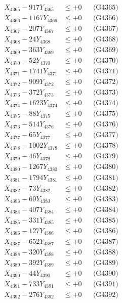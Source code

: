 \documentclass[a4paper,10pt]{article}
\begin{document}
{\begin{align}
X_{4365} - 917Y_{4365} &\leq +0 && \text{(G4365)} \\
X_{4366} - 1167Y_{4366} &\leq +0 && \text{(G4366)} \\
X_{4367} - 207Y_{4367} &\leq +0 && \text{(G4367)} \\
X_{4368} - 24Y_{4368} &\leq +0 && \text{(G4368)} \\
X_{4369} - 363Y_{4369} &\leq +0 && \text{(G4369)} \\
X_{4370} - 52Y_{4370} &\leq +0 && \text{(G4370)} \\
\allowbreak
X_{4371} - 1741Y_{4371} &\leq +0 && \text{(G4371)} \\
X_{4372} - 909Y_{4372} &\leq +0 && \text{(G4372)} \\
X_{4373} - 372Y_{4373} &\leq +0 && \text{(G4373)} \\
X_{4374} - 1623Y_{4374} &\leq +0 && \text{(G4374)} \\
X_{4375} - 88Y_{4375} &\leq +0 && \text{(G4375)} \\
X_{4376} - 514Y_{4376} &\leq +0 && \text{(G4376)} \\
X_{4377} - 65Y_{4377} &\leq +0 && \text{(G4377)} \\
X_{4378} - 1002Y_{4378} &\leq +0 && \text{(G4378)} \\
X_{4379} - 46Y_{4379} &\leq +0 && \text{(G4379)} \\
X_{4380} - 1267Y_{4380} &\leq +0 && \text{(G4380)} \\
\allowbreak
X_{4381} - 1794Y_{4381} &\leq +0 && \text{(G4381)} \\
X_{4382} - 73Y_{4382} &\leq +0 && \text{(G4382)} \\
X_{4383} - 60Y_{4383} &\leq +0 && \text{(G4383)} \\
X_{4384} - 407Y_{4384} &\leq +0 && \text{(G4384)} \\
X_{4385} - 331Y_{4385} &\leq +0 && \text{(G4385)} \\
X_{4386} - 127Y_{4386} &\leq +0 && \text{(G4386)} \\
X_{4387} - 652Y_{4387} &\leq +0 && \text{(G4387)} \\
X_{4388} - 320Y_{4388} &\leq +0 && \text{(G4388)} \\
X_{4389} - 392Y_{4389} &\leq +0 && \text{(G4389)} \\
X_{4390} - 44Y_{4390} &\leq +0 && \text{(G4390)} \\
\allowbreak
X_{4391} - 733Y_{4391} &\leq +0 && \text{(G4391)} \\
X_{4392} - 276Y_{4392} &\leq +0 && \text{(G4392)} \\

\end{align}}
\end{document}
